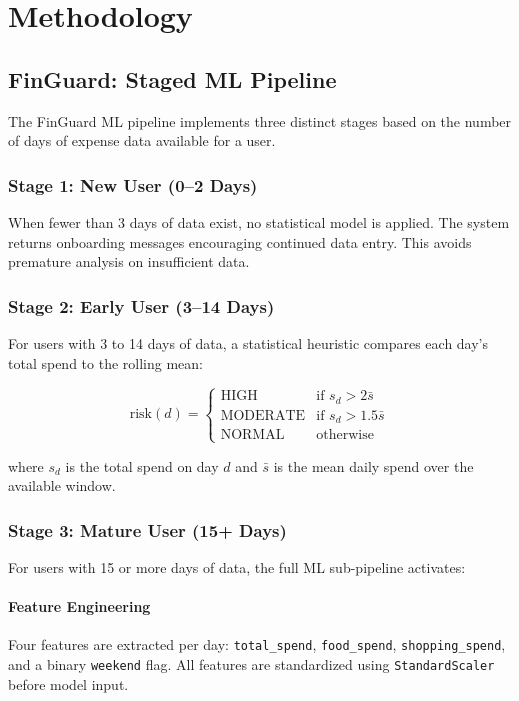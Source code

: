 \documentclass[]{IEEEtran}
\begin{document}
\section{Methodology}
\label{sec:methodology}

\subsection{FinGuard: Staged ML Pipeline}

The FinGuard ML pipeline implements three distinct stages based on the number of days of expense data available for a user.

\subsubsection{Stage 1: New User (0--2 Days)}
When fewer than 3 days of data exist, no statistical model is applied. The system returns onboarding messages encouraging continued data entry. This avoids premature analysis on insufficient data.

\subsubsection{Stage 2: Early User (3--14 Days)}
For users with 3 to 14 days of data, a statistical heuristic compares each day's total spend to the rolling mean:

\begin{equation}
\text{risk}(d) =
\begin{cases}
\text{HIGH} & \text{if } s_d > 2\bar{s} \\
\text{MODERATE} & \text{if } s_d > 1.5\bar{s} \\
\text{NORMAL} & \text{otherwise}
\end{cases}
\end{equation}

where $s_d$ is the total spend on day $d$ and $\bar{s}$ is the mean daily spend over the available window.

\subsubsection{Stage 3: Mature User (15+ Days)}
For users with 15 or more days of data, the full ML sub-pipeline activates:

\paragraph{Feature Engineering}
Four features are extracted per day: \texttt{total\_spend}, \texttt{food\_spend}, \texttt{shopping\_spend}, and a binary \texttt{weekend} flag. All features are standardized using \texttt{StandardScaler} before model input.
\end{document}
